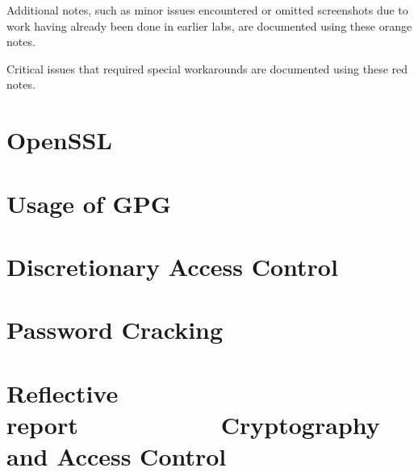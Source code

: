 \documentclass[12pt]{report}
\begin{document}
    \vspace{50pt}

    \begin{tcolorbox}[colback=orange!5!white,colframe=orange!75!black,title=Example note]
        Additional notes, such as minor issues encountered or omitted screenshots due to
        work having already been done in earlier labs, are documented using these orange notes.
    \end{tcolorbox}

    \vspace{5pt}

    \begin{tcolorbox}[colback=red!5!white,colframe=red!75!black,title=Example important note]
        Critical issues that required special workarounds are documented using these red notes.
    \end{tcolorbox}


    \chapter{OpenSSL}\label{ch:lab1}
    

    \newpage

    \chapter{Usage of GPG}\label{ch:lab2}
    

    \addtocounter{chapter}{2} %
    \chapter{Discretionary Access Control}\label{ch:lab5}
    

    \chapter{Password Cracking}\label{ch:lab6}
    

    \chapter*{Reflective report~~~~~~~~~~~\footnotesize{Cryptography and Access Control}}\label{ch:conclusion}
\end{document}
